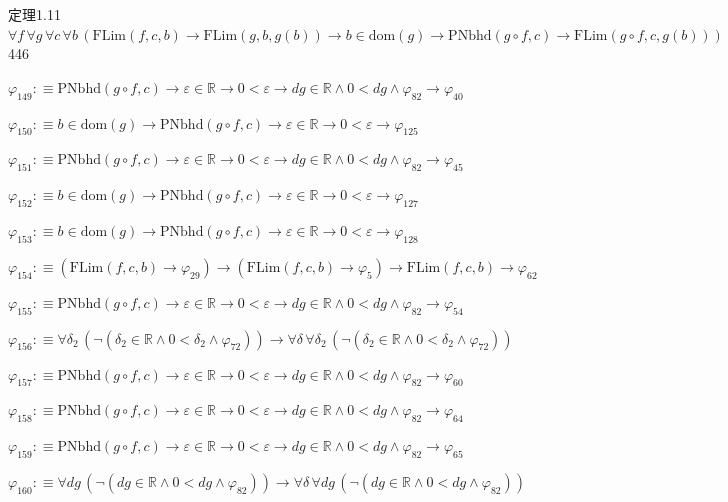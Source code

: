 \begin{fullproof}{定理1.11}{$\forall f\,\forall g\,\forall c\,\forall b\,(\mathrm{FLim}(f,c,b) \to \mathrm{FLim}(g,b,g(b)) \to b \in \mathrm{dom}(g) \to \mathrm{PNbhd}(g \circ f,c) \to \mathrm{FLim}(g \circ f,c,g(b)))$}{446}
\begin{abbrevlist}
\item $\varphi_{149} :\equiv \mathrm{PNbhd}(g \circ f,c) \to \varepsilon \in \mathbb{R} \to 0 < \varepsilon \to \mathit{dg} \in \mathbb{R} \land 0 < \mathit{dg} \land \varphi_{82} \to \varphi_{40}$
\item $\varphi_{150} :\equiv b \in \mathrm{dom}(g) \to \mathrm{PNbhd}(g \circ f,c) \to \varepsilon \in \mathbb{R} \to 0 < \varepsilon \to \varphi_{125}$
\item $\varphi_{151} :\equiv \mathrm{PNbhd}(g \circ f,c) \to \varepsilon \in \mathbb{R} \to 0 < \varepsilon \to \mathit{dg} \in \mathbb{R} \land 0 < \mathit{dg} \land \varphi_{82} \to \varphi_{45}$
\item $\varphi_{152} :\equiv b \in \mathrm{dom}(g) \to \mathrm{PNbhd}(g \circ f,c) \to \varepsilon \in \mathbb{R} \to 0 < \varepsilon \to \varphi_{127}$
\item $\varphi_{153} :\equiv b \in \mathrm{dom}(g) \to \mathrm{PNbhd}(g \circ f,c) \to \varepsilon \in \mathbb{R} \to 0 < \varepsilon \to \varphi_{128}$
\item $\varphi_{154} :\equiv (\mathrm{FLim}(f,c,b) \to \varphi_{29}) \to (\mathrm{FLim}(f,c,b) \to \varphi_{5}) \to \mathrm{FLim}(f,c,b) \to \varphi_{62}$
\item $\varphi_{155} :\equiv \mathrm{PNbhd}(g \circ f,c) \to \varepsilon \in \mathbb{R} \to 0 < \varepsilon \to \mathit{dg} \in \mathbb{R} \land 0 < \mathit{dg} \land \varphi_{82} \to \varphi_{54}$
\item $\varphi_{156} :\equiv \forall \delta_{2}\,(\neg (\delta_{2} \in \mathbb{R} \land 0 < \delta_{2} \land \varphi_{72})) \to \forall \delta\,\forall \delta_{2}\,(\neg (\delta_{2} \in \mathbb{R} \land 0 < \delta_{2} \land \varphi_{72}))$
\item $\varphi_{157} :\equiv \mathrm{PNbhd}(g \circ f,c) \to \varepsilon \in \mathbb{R} \to 0 < \varepsilon \to \mathit{dg} \in \mathbb{R} \land 0 < \mathit{dg} \land \varphi_{82} \to \varphi_{60}$
\item $\varphi_{158} :\equiv \mathrm{PNbhd}(g \circ f,c) \to \varepsilon \in \mathbb{R} \to 0 < \varepsilon \to \mathit{dg} \in \mathbb{R} \land 0 < \mathit{dg} \land \varphi_{82} \to \varphi_{64}$
\item $\varphi_{159} :\equiv \mathrm{PNbhd}(g \circ f,c) \to \varepsilon \in \mathbb{R} \to 0 < \varepsilon \to \mathit{dg} \in \mathbb{R} \land 0 < \mathit{dg} \land \varphi_{82} \to \varphi_{65}$
\item $\varphi_{160} :\equiv \forall \mathit{dg}\,(\neg (\mathit{dg} \in \mathbb{R} \land 0 < \mathit{dg} \land \varphi_{82})) \to \forall \delta\,\forall \mathit{dg}\,(\neg (\mathit{dg} \in \mathbb{R} \land 0 < \mathit{dg} \land \varphi_{82}))$

\end{abbrevlist}
\end{fullproof}
